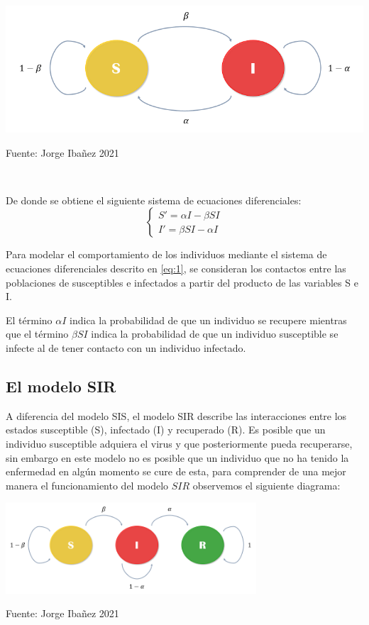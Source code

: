 \begin{center}
	\includegraphics[width=0.65\linewidth]{Imagenes/esquema_sis.PNG}
\end{center}

\begin{center}
    \caption{Fuente: Jorge Ibañez 2021} \\
\end{center}

De donde se obtiene el siguiente sistema de ecuaciones diferenciales:
\begin{equation}
    \left\{
    \begin{array}{c}
        S' = \alpha I - \beta SI \\
        I' = \beta SI - \alpha I
    \end{array}
    \right. \label{eq:1}
\end{equation}

Para modelar el comportamiento de los individuos mediante el sistema de ecuaciones diferenciales descrito en \ref{eq:1}, se consideran los contactos entre las poblaciones de susceptibles e infectados a partir del producto de las variables S e I. 

El término $\alpha I$ indica la probabilidad de que un individuo se recupere mientras que el término $\beta SI$ indica la probabilidad de que un individuo susceptible se infecte al de tener contacto con un individuo infectado. \cite{diego2010}

\subsection*{El modelo SIR}

A diferencia del modelo SIS, el modelo SIR describe las interacciones entre los estados susceptible (S), infectado (I) y recuperado (R). Es posible que un individuo susceptible adquiera el virus y que posteriormente pueda recuperarse, sin embargo en este modelo no es posible que un individuo que no ha tenido la enfermedad en algún momento se cure de esta, para comprender de una mejor manera el funcionamiento del modelo $SIR$ observemos el siguiente diagrama:

\begin{center}
	\includegraphics[width=0.7\textwidth]{Imagenes/esquema_sir.PNG}
\end{center}
\begin{center}
    \caption{Fuente: Jorge Ibañez 2021}
\end{center}

